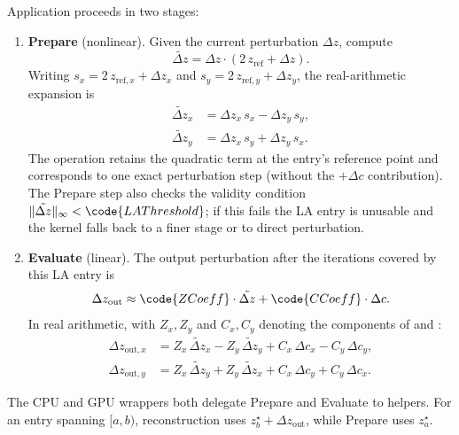 Application proceeds in two stages:
\begin{enumerate}
  \item \textbf{Prepare} (nonlinear).  Given the current perturbation
        \(\Delta z\), compute
        \begin{equation}
        \tilde{\Delta z} = \Delta z\cdot(2\,z_\mathrm{ref} + \Delta z).
        \label{eq:la-prepare}
        \end{equation}
        Writing $s_x = 2\,z_{\mathrm{ref},x} + \Delta z_x$ and
        $s_y = 2\,z_{\mathrm{ref},y} + \Delta z_y$, the real-arithmetic
        expansion is
        \begin{align}
        \tilde{\Delta z}_x &= \Delta z_x\,s_x - \Delta z_y\,s_y, \\
        \tilde{\Delta z}_y &= \Delta z_x\,s_y + \Delta z_y\,s_x.
        \end{align}
        The operation retains the quadratic term at the entry's reference point and
        corresponds to one exact perturbation step (without the
        \(+\Delta c\) contribution).  The Prepare step also checks the
        validity condition
        \(\lVert\tilde{\Delta z}\rVert_\infty < \code{LAThreshold}\);
        if this fails the LA entry is unusable and the kernel falls back
        to a finer stage or to direct perturbation.

  \item \textbf{Evaluate} (linear).  The output perturbation after the
        iterations covered by this LA entry is
        \begin{equation}
        \Delta z_\mathrm{out}
          \approx \code{ZCoeff}\cdot\tilde{\Delta z}
          + \code{CCoeff}\cdot\Delta c.
        \label{eq:la-evaluate}
        \end{equation}
        In real arithmetic, with $Z_x,Z_y$ and $C_x,C_y$ denoting the components
        of  and :
        \begin{align}
        \Delta z_{\mathrm{out},x}
          &= Z_x\,\tilde{\Delta z}_x - Z_y\,\tilde{\Delta z}_y
           + C_x\,\Delta c_x - C_y\,\Delta c_y, \\
        \Delta z_{\mathrm{out},y}
          &= Z_x\,\tilde{\Delta z}_y + Z_y\,\tilde{\Delta z}_x
           + C_x\,\Delta c_y + C_y\,\Delta c_x.
        \end{align}
\end{enumerate}
The CPU  and GPU  wrappers both
delegate Prepare and Evaluate to  helpers.
For an entry spanning $[a,b)$, reconstruction uses
$z_b^\star+\Delta z_{\mathrm{out}}$, while Prepare uses $z_a^\star$.

